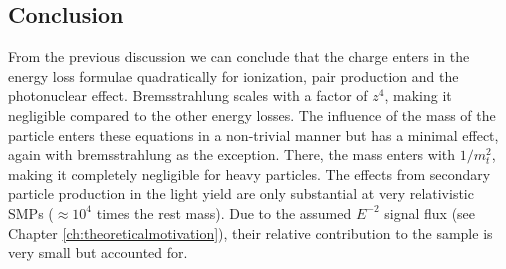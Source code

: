 \subsection{Conclusion}
\label{sub:energylossconclusion}
From the previous discussion we can conclude that the charge enters in the energy loss formulae quadratically for ionization, pair production and the photonuclear effect. Bremsstrahlung scales with a factor of $z^4$, making it negligible compared to the other energy losses. The influence of the mass of the particle enters these equations in a non-trivial manner but has a minimal effect, again with bremsstrahlung as the exception. There, the mass enters with $1/m^2_t$, making it completely negligible for heavy particles. The effects from secondary particle production in the light yield are only substantial at very relativistic SMPs ($\approx 10^4$ times the rest mass). Due to the assumed $E^{-2}$ signal flux (see Chapter \ref{ch:theoreticalmotivation}), their relative contribution to the sample is very small but accounted for.
